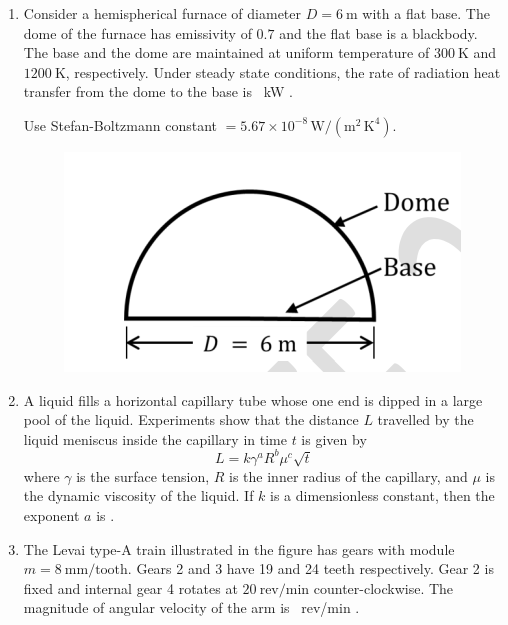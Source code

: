 \documentclass[journal]{IEEEtran}
\begin{document}
\begin{enumerate}[leftmargin=0pt]
\hfill{}

\vspace{4mm}

\item
Consider a hemispherical furnace of diameter $D = 6~\text{m}$ with a flat base. The dome of the furnace has emissivity of $0.7$ and the flat base is a blackbody. The base and the dome are maintained at uniform temperature of $300~\text{K}$ and $1200~\text{K}$, respectively. Under steady state conditions, the rate of radiation heat transfer from the dome to the base is \underline{\hspace{2cm}}~kW .

Use Stefan-Boltzmann constant $= 5.67 \times 10^{-8}\,\text{W}/(\text{m}^2\,\text{K}^4)$.

\begin{figure}[h]
\includegraphics[width=0.44\columnwidth]{Figs/image (80).png}
\caption*{}
\label{fig:q50}
\end{figure}

\hfill{}

\vspace{4mm}

\item
A liquid fills a horizontal capillary tube whose one end is dipped in a large pool of the liquid. Experiments show that the distance $L$ travelled by the liquid meniscus inside the capillary in time $t$ is given by
\[
L = k \gamma^a R^b \mu^c \sqrt{t}
\]
where $\gamma$ is the surface tension, $R$ is the inner radius of the capillary, and $\mu$ is the dynamic viscosity of the liquid. If $k$ is a dimensionless constant, then the exponent $a$ is \underline{\hspace{2cm}} .

\hfill{}

\vspace{4mm}

\item
The Levai type-A train illustrated in the figure has gears with module $m = 8~\text{mm/tooth}$. Gears 2 and 3 have 19 and 24 teeth respectively. Gear 2 is fixed and internal gear 4 rotates at $20~\text{rev/min}$ counter-clockwise. The magnitude of angular velocity of the arm is \underline{\hspace{2cm}}~rev/min .


\end{enumerate}
\end{document}
